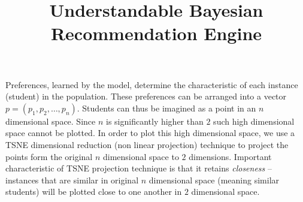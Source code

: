 \documentclass{minimal}
\title{Understandable Bayesian Recommendation Engine}
\begin{document}
    


 

Preferences, learned by the model, determine the characteristic of each instance (student) in the population. These preferences can be arranged into a vector $p = (p_1, p_2, \dots, p_n)$. Students can thus be imagined as a point in an $n$ dimensional space. Since $n$ is significantly higher than $2$ such high dimensional space cannot be plotted. In order to plot this high dimensional space, we use a TSNE dimensional reduction (non linear projection) technique to project the points form the original $n$ dimensional space to $2$ dimensions. Important characteristic of TSNE projection technique is that it retains \emph{closeness} -- instances that are similar in original $n$ dimensional space (meaning similar students) will be plotted close to one another in $2$ dimensional space.
\end{document}
